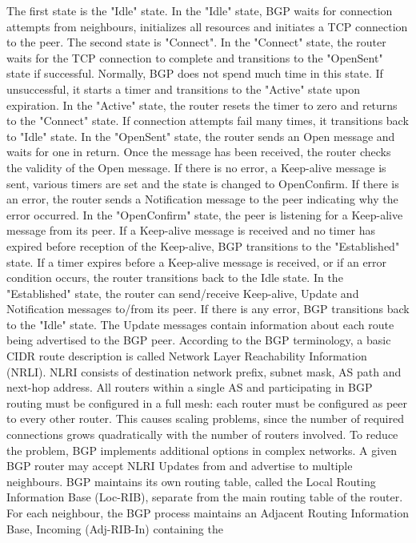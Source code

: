 \documentclass[a4paper]{article}
\begin{document}
The first state is the "Idle" state. In the "Idle" state, BGP waits for connection attempts from neighbours, initializes
all resources and initiates a TCP connection to the peer. The second state is "Connect". In the "Connect" state, the
router waits for the TCP connection to complete and transitions to the "OpenSent" state if successful. Normally, BGP
does not spend much time in this state. If unsuccessful, it starts a timer and transitions to the "Active" state upon
expiration. In the "Active" state, the router resets the timer to zero and returns to the "Connect" state. If
connection attempts fail many times, it transitions back to "Idle" state. In the "OpenSent" state, the router sends an
Open message and waits for one in return. Once the message has been received, the router checks the validity of the
Open message. If there is no error, a Keep-alive message is sent, various timers are set and the state is changed to
OpenConfirm. If there is an error, the router sends a Notification message to the peer indicating why the error
occurred. In the "OpenConfirm" state, the peer is listening for a Keep-alive message from its peer. If a Keep-alive
message is received and no timer has expired before reception of the Keep-alive, BGP transitions to the "Established"
state. If a timer expires before a Keep-alive message is received, or if an error condition occurs, the router
transitions back to the Idle state. In the "Established" state, the router can send/receive Keep-alive, Update and
Notification messages to/from its peer. If there is any error, BGP transitions back to the "Idle" state. The Update
messages contain information about each route being advertised to the BGP peer. According to the BGP terminology, a
basic CIDR route description is called Network Layer Reachability Information (NRLI). NLRI consists of destination
network prefix, subnet mask, AS path and next-hop address.
All routers within a single AS and participating in BGP routing must be configured in a full mesh: each router must be
configured as peer to every other router. This causes scaling problems, since the number of required connections grows
quadratically with the number of routers involved. To reduce the problem, BGP implements additional options in complex
networks.
A given BGP router may accept NLRI Updates from and advertise to multiple neighbours. BGP maintains its own routing
table, called the Local Routing Information Base (Loc-RIB), separate from the main routing table of the router. For
each neighbour, the BGP process maintains an Adjacent Routing Information Base, Incoming (Adj-RIB-In) containing the
\end{document}
